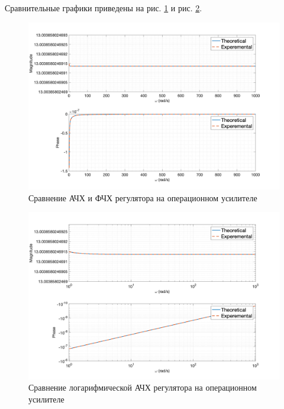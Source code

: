Сравнительные графики приведены на рис. \ref{fig:task5_freq_resp_cmp_lin} и рис. \ref{fig:task5_freq_resp_cmp_loglog}.
\begin{figure}[ht!]
    \centering
    \includegraphics[width=\textwidth]{media/plots/task5_freq_resp_cmp_lin.png}
    \caption{Сравнение АЧХ и ФЧХ регулятора на операционном усилителе}
    \label{fig:task5_freq_resp_cmp_lin}
\end{figure}
\begin{figure}[ht!]
    \centering
    \includegraphics[width=\textwidth]{media/plots/task5_freq_resp_cmp_loglog.png}
    \caption{Сравнение логарифмической АЧХ регулятора на операционном усилителе}
    \label{fig:task5_freq_resp_cmp_loglog}
\end{figure}